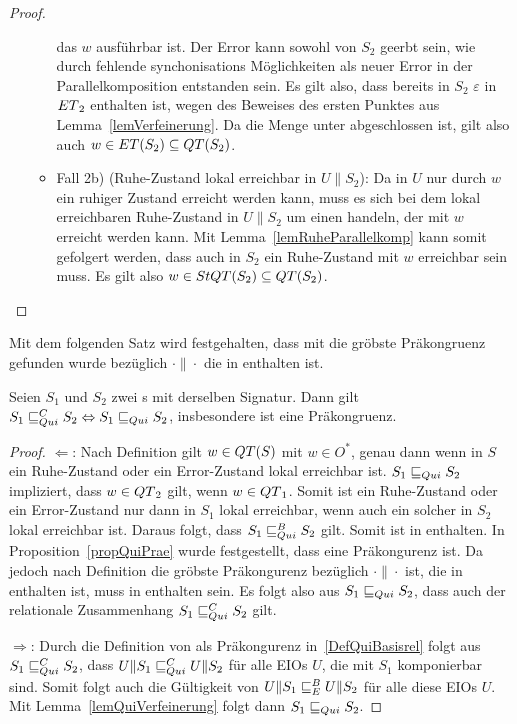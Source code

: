 \begin{proof}
\begin{itemize}
\begin{itemize}
          das $w$ ausführbar ist. Der Error kann sowohl von $S_2$ geerbt sein,
          wie durch fehlende synchonisations Möglichkeiten als neuer Error in
          der Parallelkomposition entstanden sein. Es gilt also, dass bereits
          in $S_2$ $\varepsilon$ in $ET{}_2$ enthalten ist, wegen des Beweises
          des ersten Punktes aus Lemma~\ref{lemVerfeinerung}. Da die Menge
          \ET{} unter \cont{} abgeschlossen ist, gilt also auch $w\in
          ET{}(S_2)\subseteq QT{}(S_2)$.
        \item Fall 2b) (Ruhe-Zustand lokal erreichbar in $U\|S_2$): Da in $U$
          nur durch $w$ ein ruhiger Zustand erreicht werden kann, muss es sich
          bei dem lokal erreichbaren Ruhe-Zustand in $U\|S_2$ um einen handeln,
          der mit $w$ erreicht werden kann. Mit Lemma~\ref{lemRuheParallelkomp}
          kann somit gefolgert werden, dass auch in $S_2$ ein Ruhe-Zustand mit
          $w$ erreichbar sein muss. Es gilt also $w\in StQT{}(S_2)\subseteq
          QT{}(S_2)$.
      \end{itemize}
  \end{itemize}
\end{proof}

Mit dem folgenden Satz wird festgehalten, dass mit \QRel{} die gröbste
Präkongruenz gefunden wurde bezüglich $\cdot\|\cdot$ die in \QBRel{} enthalten
ist.

\begin{satz}
  \label{satzQuiFullAbst}
  Seien $S_1$ und $S_2$ zwei \EIO{}s mit derselben Signatur. Dann gilt
  $S_1\sqsubseteq _{Qui}^C S_2\Leftrightarrow S_1\sqsubseteq _{Qui} S_2$, insbesondere ist \QRel{} eine
  Präkongruenz.
\end{satz}

\begin{proof}
  \glqq{}$\Leftarrow$\grqq{}: Nach Definition gilt $w\in QT{}(S)$ mit $w\in
  O^*$, genau dann wenn in $S$ ein Ruhe-Zustand oder ein Error-Zustand lokal
  erreichbar ist. $S_1\sqsubseteq _{Qui} S_2$ impliziert, dass $w\in QT{}_2$ gilt, wenn
  $w\in QT{}_1$. Somit ist ein Ruhe-Zustand oder ein Error-Zustand nur dann in
  $S_1$ lokal erreichbar, wenn auch ein solcher in $S_2$ lokal erreichbar ist.
  Daraus folgt, dass $S_1\sqsubseteq _{Qui}^B S_2$ gilt. Somit ist \QRel{} in \QBRel{}
  enthalten. In Proposition~\ref{propQuiPrae} wurde festgestellt, dass \QRel{}
  eine Präkongurenz ist. Da jedoch \QCRel{} nach Definition die gröbste
  Präkongurenz bezüglich $\cdot\|\cdot$ ist, die in \QBRel{} enthalten ist,
  muss \QRel{} in \QCRel{} enthalten sein. Es folgt also aus $S_1\sqsubseteq _{Qui} S_2$,
  dass auch der relationale Zusammenhang $S_1\sqsubseteq _{Qui}^C S_2$ gilt.

  \glqq{}$\Rightarrow$\grqq{}: Durch die Definition von \QCRel{} als
  Präkongurenz in~\ref{DefQuiBasisrel} folgt aus $S_1\sqsubseteq _{Qui}^C{} S_2$, dass
  $U\|S_1\sqsubseteq _{Qui}^C U\|S_2$ für alle EIOs $U$, die mit $S_1$ komponierbar sind.
  Somit folgt auch die Gültigkeit von $U\|S_1\sqsubseteq _E^B U\|S_2$ für alle diese EIOs
  $U$. Mit Lemma~\ref{lemQuiVerfeinerung} folgt dann $S_1\sqsubseteq _{Qui}{} S_2$.
\end{proof}

